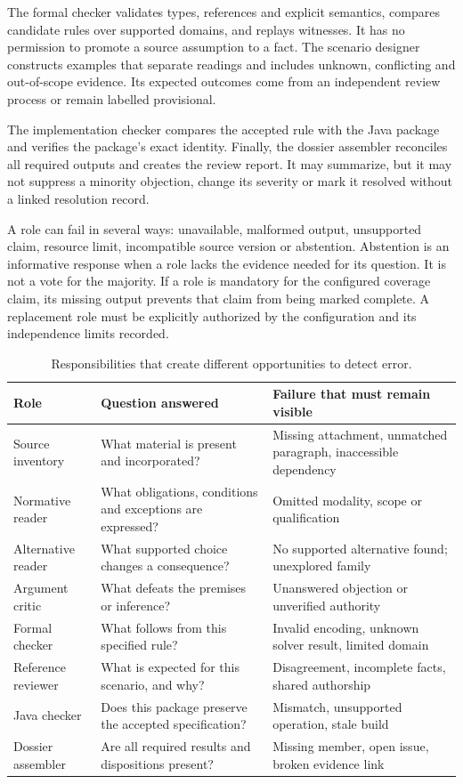 \documentclass[12pt,a4paper,oneside,openany]{book}
\begin{document}
The formal checker validates types, references and explicit semantics, compares
candidate rules over supported domains, and replays witnesses. It has no
permission to promote a source assumption to a fact. The scenario designer
constructs examples that separate readings and includes unknown, conflicting and
out-of-scope evidence. Its expected outcomes come from an independent review
process or remain labelled provisional.

The implementation checker compares the accepted rule with the Java package and
verifies the package's exact identity. Finally, the dossier assembler reconciles
all required outputs and creates the review report. It may summarize, but it may
not suppress a minority objection, change its severity or mark it resolved without
a linked resolution record.

A role can fail in several ways: unavailable, malformed output, unsupported
claim, resource limit, incompatible source version or abstention. Abstention is
an informative response when a role lacks the evidence needed for its question.
It is not a vote for the majority. If a role is mandatory for the configured
coverage claim, its missing output prevents that claim from being marked complete.
A replacement role must be explicitly authorized by the configuration and its
independence limits recorded.

\begin{table}[htbp]
\centering\small
\caption{Responsibilities that create different opportunities to detect error.}
\label{tab:ensemble-roles}
\begin{tabularx}{\textwidth}{P{31mm}YY}
\toprule
Role & Question answered & Failure that must remain visible\\
\midrule
Source inventory & What material is present and incorporated? & Missing attachment, unmatched paragraph, inaccessible dependency\\
Normative reader & What obligations, conditions and exceptions are expressed? & Omitted modality, scope or qualification\\
Alternative reader & What supported choice changes a consequence? & No supported alternative found; unexplored family\\
Argument critic & What defeats the premises or inference? & Unanswered objection or unverified authority\\
Formal checker & What follows from this specified rule? & Invalid encoding, unknown solver result, limited domain\\
Reference reviewer & What is expected for this scenario, and why? & Disagreement, incomplete facts, shared authorship\\
Java checker & Does this package preserve the accepted specification? & Mismatch, unsupported operation, stale build\\
Dossier assembler & Are all required results and dispositions present? & Missing member, open issue, broken evidence link\\
\bottomrule
\end{tabularx}
\end{table}
\end{document}
